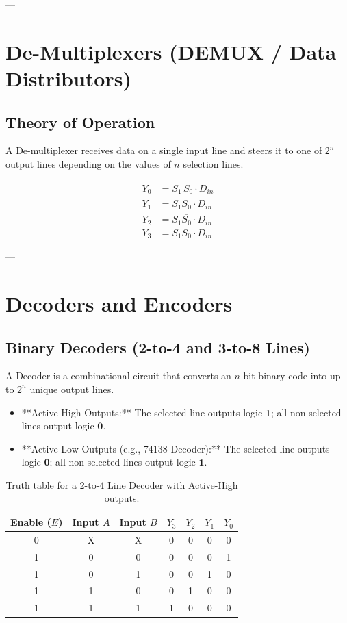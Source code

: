 ---

\section{De-Multiplexers (DEMUX / Data Distributors)}

\subsection{Theory of Operation}
A De-multiplexer receives data on a single input line and steers it to one of $2^n$ output lines depending on the values of $n$ selection lines.

\begin{keyequation}
\begin{align}
    Y_0 &= \overline{S_1}\,\overline{S_0} \cdot D_{in} \\
    Y_1 &= \overline{S_1}S_0 \cdot D_{in} \\
    Y_2 &= S_1\overline{S_0} \cdot D_{in} \\
    Y_3 &= S_1S_0 \cdot D_{in}
\end{align}
\end{keyequation}

---

\section{Decoders and Encoders}

\subsection{Binary Decoders (2-to-4 and 3-to-8 Lines)}
A Decoder is a combinational circuit that converts an $n$-bit binary code into up to $2^n$ unique output lines. 

\begin{itemize}
    \item **Active-High Outputs:** The selected line outputs logic $\mathbf{1}$; all non-selected lines output logic $\mathbf{0}$.
    \item **Active-Low Outputs (e.g., 74138 Decoder):** The selected line outputs logic $\mathbf{0}$; all non-selected lines output logic $\mathbf{1}$.
\end{itemize}

\begin{table}[htbp]
\centering
\small
\begin{tabular}{c|cc|cccc}
\toprule
\textbf{Enable ($E$)} & \textbf{Input $A$} & \textbf{Input $B$} & \textbf{$Y_3$} & \textbf{$Y_2$} & \textbf{$Y_1$} & \textbf{$Y_0$} \\
\midrule
0 & X & X & 0 & 0 & 0 & 0 \\
1 & 0 & 0 & 0 & 0 & 0 & 1 \\
1 & 0 & 1 & 0 & 0 & 1 & 0 \\
1 & 1 & 0 & 0 & 1 & 0 & 0 \\
1 & 1 & 1 & 1 & 0 & 0 & 0 \\
\bottomrule
\end{tabular}
\caption{Truth table for a 2-to-4 Line Decoder with Active-High outputs.}
\label{tab:2-to-4-decoder}
\end{table}

